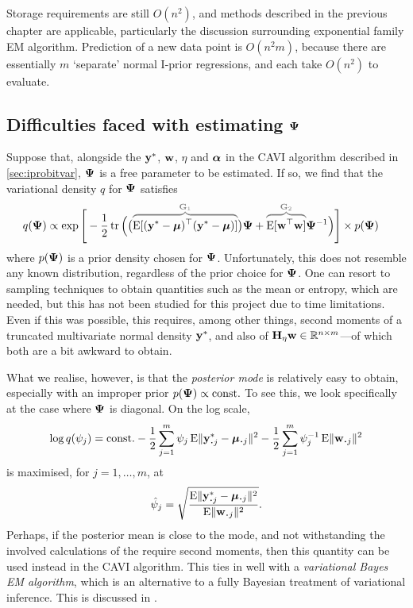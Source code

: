 Storage requirements are still $O(n^2)$, and methods described in the previous chapter are applicable, particularly the discussion surrounding exponential family EM algorithm.
Prediction of a new data point is $O(n^2m)$, because there are essentially $m$ `separate' normal I-prior regressions, and each take $O(n^2)$ to evaluate.

\subsection{Difficulties faced with estimating \texorpdfstring{${\bm\Psi}$}{$\Psi$}}

Suppose that, alongside the ${\mathbf y}^*$, ${\mathbf w}$, $\eta$ and ${\bm\alpha}$ in the CAVI algorithm described in \cref{sec:iprobitvar}, ${\bm\Psi}$ is a free parameter to be estimated.
If so, we find that the variational density $q$ for ${\bm\Psi}$ satisfies
\begin{align*}
  q(\bPsi)
  &\propto \exp\Bigg[-\half \tr \Big(
  \big( %
  \greyoverbrace{\E[(\by^* - \bmu)^\top (\by^* - \bmu)]}{\bG_1}
  \big)\bPsi +
  \greyoverbrace{\E[\bw^\top\bw]}{\bG_2} \bPsi^{-1}
  \Big) \Bigg] \times p(\bPsi)
\end{align*}
where $p({\bm\Psi})$ is a prior density chosen for ${\bm\Psi}$.
Unfortunately, this does not resemble any known distribution, regardless of the prior choice for ${\bm\Psi}$.
One can resort to sampling techniques to obtain quantities such as the mean or entropy, which are needed, but this has not been studied for this project due to time limitations.
Even if this was possible, this requires, among other things, second moments of a truncated multivariate normal density ${\mathbf y}^*$, and also of ${\mathbf H}_\eta{\mathbf w} \in \mathbb{R}^{n\times m}$---of which both are a bit awkward to obtain.

What we realise, however, is that the \emph{posterior mode} is relatively easy to obtain, especially with an improper prior $p({\bm\Psi})\propto \text{const.}\hspace{0.01em}$ 
To see this, we look specifically at the case where ${\bm\Psi}$ is diagonal.
On the log scale,
\begin{align*}
  \log  q(\psi_j)
  &= \const - \half\sum_{j=1}^m \psi_j \E\norm{\by_{\bigcdot j}^* -  \bmu_{\bigcdot j}}^2 - \half\sum_{j=1}^m \psi_j^{-1} \E\norm{\bw_{\bigcdot j}}^2 \\
\end{align*}
is maximised, for $j=1,\dots,m$, at
\[
  \hat\psi_j = \sqrt{\frac{ \E\norm{\by_{\bigcdot j}^* -  \bmu_{\bigcdot j}}^2 }{\E\norm{\bw_{\bigcdot j}}^2}}.
\]
Perhaps, if the posterior mean is close to the mode, and not withstanding the involved calculations of the require second moments, then this quantity can be used instead in the CAVI algorithm.
This ties in well with a \emph{variational Bayes EM algorithm}, which is an alternative to a fully Bayesian treatment of variational inference.
This is discussed in .



